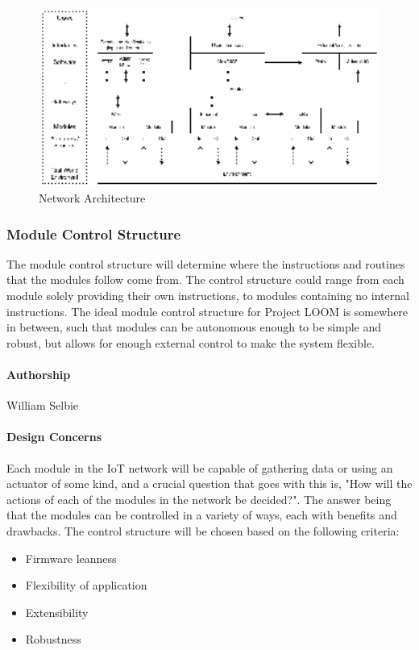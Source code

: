 \documentclass[onecolumn, draftclsnofoot,10pt, compsoc]{IEEEtran}
\begin{document}
    \begin{figure}[H]
        \centering
        \caption{Network Architecture}
        \label{fig:network_architecture}
        \includegraphics[width=16cm]{network_architecture.eps}         
     \end{figure}


\subsubsection{Module Control Structure}
    The module control structure will determine where the instructions and routines that the modules follow come from. The control structure could range from each module solely providing their own instructions, to modules containing no internal instructions. The ideal module control structure for Project LOOM is somewhere in between, such that modules can be autonomous enough to be simple and robust, but allows for enough external control to make the system flexible.

\paragraph{Authorship}
    William Selbie

\paragraph{Design Concerns}
    Each module in the IoT network will be capable of gathering data or using an actuator of some kind, and a crucial question that goes with this is, "How will the actions of each of the modules in the network be decided?". The answer being that the modules can be controlled in a variety of ways, each with benefits and drawbacks. The control structure will be chosen based on the following criteria:
    \begin{itemize}[noitemsep,topsep=-10pt]
        \item Firmware leanness
        \item Flexibility of application
        \item Extensibility
        \item Robustness
    \end{itemize}
\end{document}
